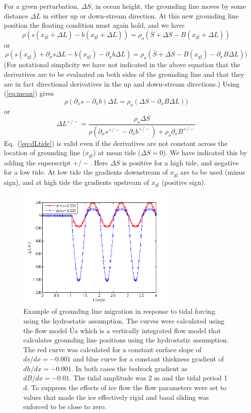 \documentclass[10pt,a4paper]{book}
\newcommand{\p}{\partial}
\newcommand{\xgl}{x_{\mathrm{gl}}}
\begin{document}
For a given perturbation, $\Delta S$, in ocean height, the grounding
line moves by some distance $\Delta L$ in either up or down-stream direction. At this new grounding line
position the floating condition must again hold, and we have
\[
\rho \left (s(\xgl+\Delta L )-b(\xgl+ \Delta L ) \right )=\rho_o (\bar{S}+\Delta S-B(\xgl+\Delta L)) 
\]
or
\[
\rho (s(\xgl) + \p_x s \Delta L -b(\xgl) - \p_x b  \Delta L )=\rho_o (\bar{S}+\Delta S-B(\xgl) - \p_x B \Delta L)) 
\]
(For notational simplicity we have not indicated in the above equation
that the derivatives are to be evaluated on both sides of the
grounding line and that they are in fact directional derivatives in
the up and down-stream directions.)  Using (\ref{eq:mean}) gives
\[
\rho (\p_x s - \p_x b  ) \Delta L=\rho_o (\Delta S- \p_x B \Delta L)) 
\]
or
\begin{equation}
\Delta L^{+/-} = \frac{\rho_o \Delta S}{\rho (\p_x s^{+/-} - \p_x b^{+/-} ) + \rho_o \p_x B^{+/-}}
\label{eq:dLtide}
\end{equation}
Eq.~(\ref{eq:dLtide}) is valid even if the derivatives are not
constant across the location of grounding line ($\xgl$) at mean tide
($\Delta S=0$). We have indicated this by adding the superscript
$+/-$. Here $\Delta S$ is positive for a high tide, and negative for a
low tide. At low tide the gradients downstream of $\xgl$ are to be
used (minus sign), and at high tide the gradients upstream of $\xgl$
(positive sign).


\begin{figure}
\centerline{\includegraphics[width=8cm]{dLTide.png}}
\caption{Example of grounding line migration in response to tidal
  forcing using the hydrostatic assumption. The curves were calculated
  using the flow model \'Ua which is a vertically integrated flow
  model that calculates grounding line positions using the hydrostatic
  assumption. The red curve was calculated for a constant surface
  slope of $ds/dx=-0.001$ and blue curve for a constant thickness
  gradient of $dh/dx=-0.001$. In both cases the bedrock gradient as
  $dB/dx=-0.01$. The tidal amplitude was 2 m and the tidal period 1 d.
  To suppress the effects of ice flow the flow parameters were set to
  values that made the ice effectively rigid and basal sliding was
  enforced to be close to zero. 
\label{fig:dLTide}}
\end{figure}
\end{document}
